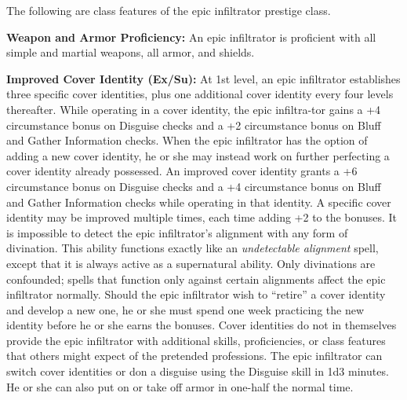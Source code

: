 \documentclass{article}
\begin{document}
The following are class features of the epic infiltrator prestige class. 

\textbf{Weapon and Armor Proficiency:} An epic infiltrator is proficient with all 
simple and martial weapons, all armor, and shields. 

\textbf{Improved Cover Identity (Ex/Su):} At 1st level, an epic infiltrator establishes 
three specific cover identities, plus one additional cover identity every four 
levels thereafter. While operating in a cover identity, the epic infiltra-tor gains 
a +4 circumstance bonus on Disguise checks and a +2 circumstance bonus on Bluff 
and Gather Information checks. When the epic infiltrator has the option of adding 
a new cover identity, he or she may instead work on further perfecting a cover 
identity already possessed. An improved cover identity grants a +6 circumstance 
bonus on Disguise checks and a +4 circumstance bonus on Bluff and Gather Information 
checks while operating in that identity. A specific cover identity may be improved 
multiple times, each time adding +2 to the bonuses. It is impossible to detect 
the epic infiltrator's alignment with any form of divination. This ability functions 
exactly like an \textit{undetectable alignment }spell, except that it is always 
active as a supernatural ability. Only divinations are confounded; spells that 
function only against certain alignments affect the epic infiltrator normally. 
Should the epic infiltrator wish to ``retire'' a cover identity and develop a new 
one, he or she must spend one week practicing the new identity before he or she 
earns the bonuses. Cover identities do not in themselves provide the epic infiltrator 
with additional skills, proficiencies, or class features that others might expect 
of the pretended professions. The epic infiltrator can switch cover identities 
or don a disguise using the Disguise skill in 1d3 minutes. He or she can also put 
on or take off armor in one-half the normal time. 
\end{document}
